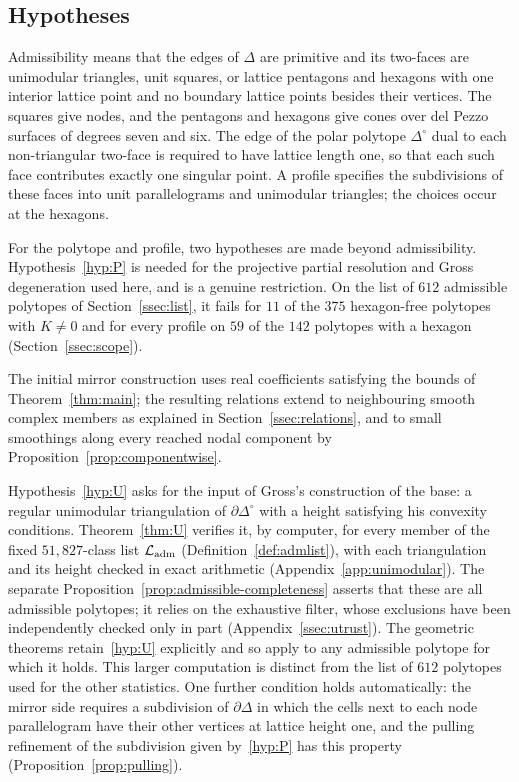 \subsection{Hypotheses}
Admissibility means that the edges of $\Delta$ are primitive and its two-faces are unimodular triangles, unit squares,
or lattice pentagons and hexagons with one interior lattice point and no boundary lattice points besides their
vertices. The squares give nodes, and the pentagons and hexagons give cones over del Pezzo surfaces of degrees seven
and six. The edge of the polar polytope $\Delta^\circ$ dual to each non-triangular two-face is required to have lattice
length one, so that each such face contributes exactly one singular point. A profile specifies the subdivisions of
these faces into unit parallelograms and unimodular triangles; the choices occur at the hexagons.

For the polytope and profile, two hypotheses are made beyond admissibility. Hypothesis~\ref{hyp:P} is needed for
the projective partial resolution and Gross degeneration used here, and is a genuine restriction. On the list of
$612$ admissible polytopes of Section~\ref{ssec:list}, it fails for $11$ of the $375$ hexagon-free polytopes with
$K\neq0$ and for every profile on $59$ of the $142$ polytopes with a hexagon (Section~\ref{ssec:scope}).

The initial mirror construction uses real coefficients satisfying the bounds of Theorem~\ref{thm:main}; the resulting relations
extend to neighbouring smooth complex members as explained in Section~\ref{ssec:relations}, and to small smoothings
along every reached nodal component by Proposition~\ref{prop:componentwise}.

Hypothesis~\ref{hyp:U} asks for the input of Gross's construction of the base: a regular unimodular triangulation of
$\partial\Delta^\circ$ with a height satisfying his convexity conditions. Theorem~\ref{thm:U} verifies it, by computer,
for every member of the fixed $51{,}827$-class list $\mathcal L_{\rm adm}$ (Definition~\ref{def:admlist}), with each
triangulation and its height checked in exact arithmetic (Appendix~\ref{app:unimodular}). The separate
Proposition~\ref{prop:admissible-completeness} asserts that these are all admissible polytopes; it relies on the
exhaustive filter, whose exclusions have been independently checked only in part (Appendix~\ref{ssec:utrust}).
The geometric theorems retain~\ref{hyp:U} explicitly and so apply to any admissible polytope for which it holds.
This larger computation is distinct from the list of $612$ polytopes used for the
other statistics. One further condition holds automatically: the mirror side requires a subdivision of $\partial\Delta$
in which the cells next to each node parallelogram have their other vertices at lattice height one, and the pulling
refinement of the subdivision given by~\ref{hyp:P} has this property (Proposition~\ref{prop:pulling}).


